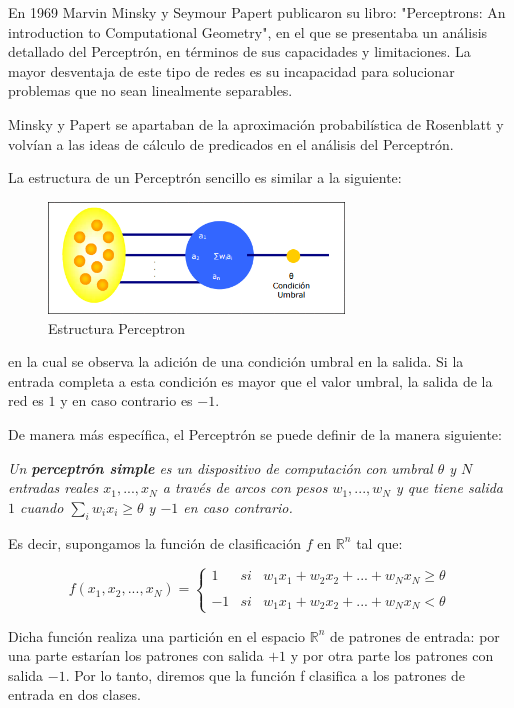 \documentclass[a4paper, 11pt]{article} %
\begin{document}
En 1969 Marvin Minsky y Seymour Papert publicaron su libro: "Perceptrons: An introduction to Computational Geometry", en el que se presentaba un análisis detallado del Perceptrón, en términos de sus capacidades y limitaciones. La mayor desventaja de este tipo de redes es su incapacidad para solucionar problemas que no sean linealmente separables.

Minsky y Papert se apartaban de la aproximación probabilística de Rosenblatt y volvían a las ideas de cálculo de predicados en el análisis del Perceptrón.

La estructura de un Perceptrón sencillo es similar a la siguiente:

\begin{figure}[H]
\centering
\includegraphics[width=0.7\textwidth]{Perceptron.PNG}
\caption{Estructura Perceptron}
\label{Estructura Perceptron}
\end{figure}

en la cual se observa la adición de una condición umbral en la salida. Si la entrada completa a esta condición es mayor que el valor umbral, la salida de la red es $1$ y en caso contrario es $-1$.

De manera más específica, el Perceptrón se puede definir de la manera siguiente:

\textit{Un \textbf{perceptrón simple} es un dispositivo de computación con umbral $\theta$ y $N$ entradas reales $x_1, ..., x_N$ a través de arcos con pesos $w_1, ..., w_N$ y que tiene salida $1$ cuando $\sum_{i}w_ix_i \geq \theta$ y $-1$ en caso contrario.}

Es decir, supongamos la función  de clasificación $f$ en $\mathbb{R}^n$ tal que:

\[
f(x_1, x_2, ..., x_N) = \left\{ \begin{array}{lcc}
             1 &   si  & w_1x_1 + w_2x_2 + ... + w_Nx_N \geq \theta \\
             \\ -1 &  si  &  w_1x_1 + w_2x_2 + ... + w_Nx_N < \theta 
             \end{array}
   \right.
\]

Dicha función realiza una partición en el espacio $\mathbb{R}^n$ de patrones de entrada: por una parte estarían los patrones con salida $+1$ y por otra parte los patrones con salida $- 1$. Por lo tanto, diremos que la función f clasifica a los patrones de entrada en dos clases.
\end{document}
